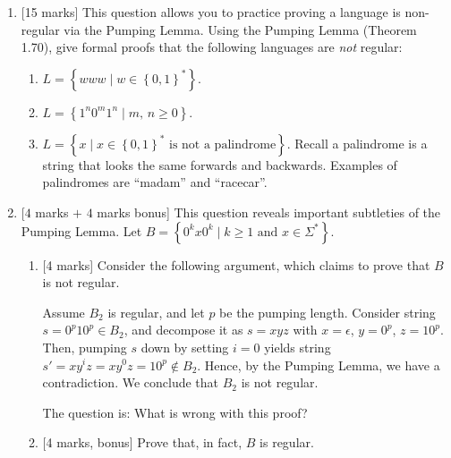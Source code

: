 \documentclass{article}
\newcommand{\set}[1]{{\left\{#1\right\}}}    %
\begin{document}
\begin{enumerate}
            \\
    \item {[15 marks]} This question allows you to practice proving a language is non-regular via the Pumping Lemma. Using the Pumping Lemma (Theorem 1.70), give formal proofs that the following languages are \emph{not} regular:
        \begin{enumerate}
            \item $L=\set{www\mid w\in\set{0,1}^*}$.
            \item $L=\set{1^n0^m1^n\mid m\text{, }n\geq 0}$.
            \item $L=\set{x\mid x\in\set{0,1}^*\text{ is not a palindrome}}$. Recall a palindrome is a string that looks the same forwards and backwards. Examples of palindromes are ``madam'' and ``racecar''.
        \end{enumerate}
    \item  {[$4$ marks $+$ $4$ marks bonus]} This question reveals important subtleties of the Pumping Lemma. Let $B=\set{0^kx0^k \mid k\geq 1\text{ and } x\in\Sigma^*}$.
                \begin{enumerate}
                \item{[4 marks]} Consider the following argument, which claims to prove that $B$ is not regular.

                    Assume $B_2$ is regular, and let $p$ be the pumping length. Consider string $s=0^p10^p\in B_2$, and decompose it as $s=xyz$ with $x=\epsilon$, $y=0^p$, $z=10^p$. Then, pumping $s$ down by setting $i=0$ yields string $s'=xy^iz=xy^0z=10^p\not \in B_2$. Hence, by the Pumping Lemma, we have a contradiction. We conclude that $B_2$ is not regular.

                    The question is: What is wrong with this proof?
                \item {[4 marks, bonus]} Prove that, in fact, $B$ is regular.
            \end{enumerate}
\end{enumerate}
\end{document}
